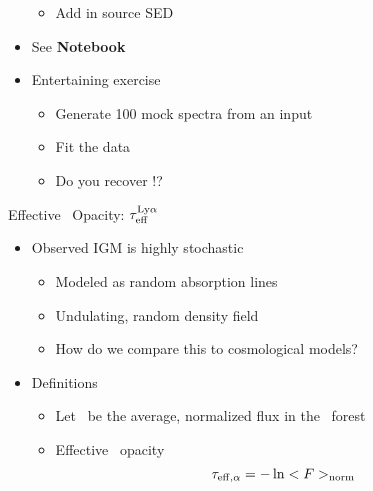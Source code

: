 \documentclass[12pt,letterpaper]{article}
\begin{document}
\begin{Aenumerate}
\begin{itemize}
\begin{itemize}
\begin{itemize}
			\end{itemize}
		\item Add in source SED
		\end{itemize}
	\item See {\bf Notebook}
	\item Entertaining exercise
		\begin{itemize}
		\item Generate 100 mock spectra from an input \fnhi
		\item Fit the data
		\item Do you recover \fnhi!?
		\end{itemize}
	\end{itemize}

{\bf \item Effective \lya\ Opacity: $\tau_{\rm eff}^{\rm Ly\alpha}$}
	\begin{itemize}
	\item Observed IGM is highly stochastic
		\begin{itemize}
		\item Modeled as random absorption lines
		\item Undulating, random density field
		\item How do we compare this to cosmological models?
		\end{itemize}
	\item Definitions
		\begin{itemize}
		\item Let \fnorm\ be the average, normalized flux in
		the \lya\ forest %
		\item Effective \lya\ opacity
		\begin{equation}
		\tau_{\rm eff, \alpha} = - \ln <F>_{\rm norm}
		\end{equation}


\end{itemize}
\end{itemize}
\end{Aenumerate}
\end{document}
